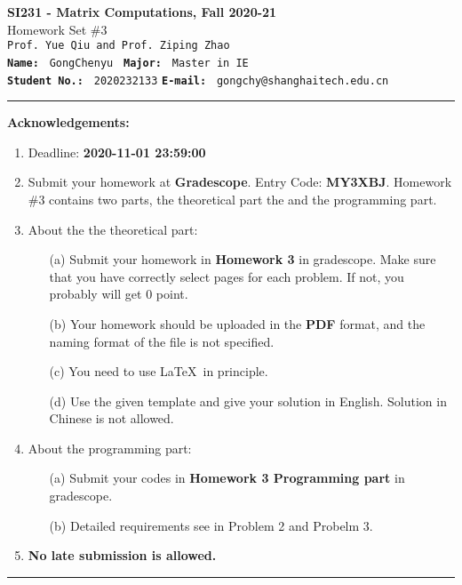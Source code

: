 \documentclass[english,onecolumn]{IEEEtran}
\begin{document}
\begin{center}
	\textbf{\LARGE{SI231 - Matrix Computations, Fall 2020-21}}\\
	{\Large Homework Set \#3}\\
	\texttt{Prof. Yue Qiu and Prof. Ziping Zhao}\\
	\texttt{\textbf{Name:}}   	\texttt{ GongChenyu }  		\hspace{1bp}
	\texttt{\textbf{Major:}}  	\texttt{ Master in IE } 	\\
	\texttt{\textbf{Student No.:}} 	\texttt{ 2020232133}     \hspace{1bp}
	\texttt{\textbf{E-mail:}} 	\texttt{ gongchy@shanghaitech.edu.cn}
\par\end{center}



\noindent
\rule{\linewidth}{0.4pt}
{\bf {\large Acknowledgements:}}
\begin{enumerate}
    \item Deadline: \textbf{2020-11-01 23:59:00}
    \item Submit your homework at \textbf{Gradescope}. Entry Code: \textbf{MY3XBJ}. 
    Homework \#3 contains two parts, the theoretical part the and the programming part.
    \item About the the theoretical part:
    \begin{enumerate}
            \item[(a)] Submit your homework in \textbf{Homework 3} in gradescope. Make sure that you have correctly select pages for each problem. If not, you probably will get 0 point.
            \item[(b)] Your homework should be uploaded in the \textbf{PDF} format, and the naming format of the file is not specified.
            \item[(c)] You need to use \LaTeX $\,$ in principle.
            \item[(d)] Use the given template and give your solution in English. Solution in Chinese is not allowed. 
        \end{enumerate}
  \item About the programming part:
  \begin{enumerate}
      \item[(a)] Submit your codes in \textbf{Homework 3 Programming part} in gradescope.
      \item[(b)] Detailed requirements see in Problem 2 and Probelm 3.
  \end{enumerate}
  \item \textbf{No late submission is allowed.}
\end{enumerate}
\rule{\linewidth}{0.4pt}
\newpage 
\end{document}
